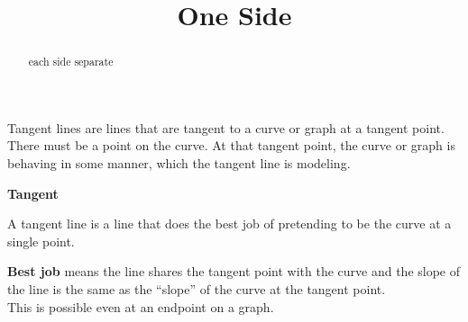 \documentclass{ximera}
\title{One Side}
\begin{document}
\begin{abstract}
each side separate
\end{abstract}
\maketitle




Tangent lines are lines that are tangent to a curve or graph at a tangent point. There must be a point on the curve. At that tangent point, the curve or graph is behaving in some manner, which the tangent line is modeling.  \\

\begin{idea} \textbf{\textcolor{blue!55!black}{Tangent}}

A tangent line is a line that does the best job of pretending to be the curve at a single point.
\end{idea}
\textbf{Best job} means the line shares the tangent point with the curve and the slope of the line is the same as the ``slope'' of the curve at the tangent point. \\





This is possible even at an endpoint on a graph.










\begin{image}
\end{image}
\end{document}
